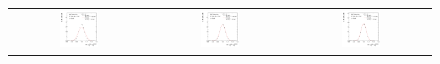 \begin{figure}[ht]
  \centering
  \begin{tabular}{ccc}
    \includegraphics[width=0.3\textwidth]{figures/ResFit_Spring10QCDFlat_Gauss_Eta0_MCClosure_PtBin1} &
    \includegraphics[width=0.3\textwidth]{figures/ResFit_Spring10QCDFlat_Gauss_Eta0_MCClosure_PtBin2} &
    \includegraphics[width=0.3\textwidth]{figures/ResFit_Spring10QCDFlat_Gauss_Eta0_MCClosure_PtBin3} \\


\end{tabular}
\end{figure}
